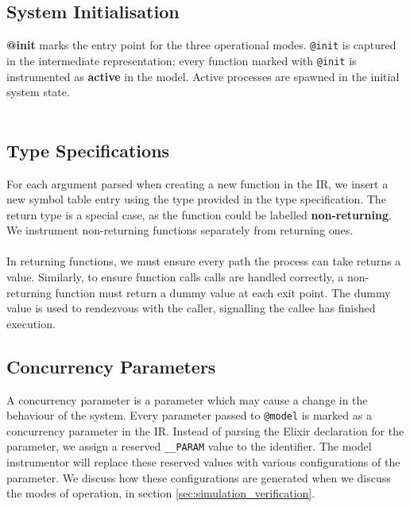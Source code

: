 \subsection{System Initialisation}
\textbf{@init} marks the entry point for the three operational modes. \texttt{@init} is captured in the intermediate representation; every function marked with \texttt{@init} is instrumented as \textbf{active} in the model. Active processes are spawned in the initial system state.
\\ \\
\subsection{Type Specifications}
For each argument parsed when creating a new function in the IR, we insert a new symbol table entry using the type provided in the type specification. The return type is a special case, as the function could be labelled \textbf{non-returning}. We instrument non-returning functions separately from returning ones.
\\ \\
In returning functions, we must ensure every path the process can take returns a value. Similarly, to ensure function calls calls are handled correctly, a non-returning function must return a dummy value at each exit point. The dummy value is used to rendezvous with the caller, signalling the callee has finished execution.
\subsection{Concurrency Parameters}
A concurrency parameter is a parameter which may cause a change in the behaviour of the system. Every parameter passed to \texttt{@model} is marked as a concurrency parameter in the IR. Instead of parsing the Elixir declaration for the parameter, we assign a reserved \texttt{\_\_PARAM} value to the identifier. The model instrumentor will replace these reserved values with various configurations of the parameter. We discuss how these configurations are generated when we discuss the modes of operation, in section \ref{sec:simulation_verification}.
\\ \\

